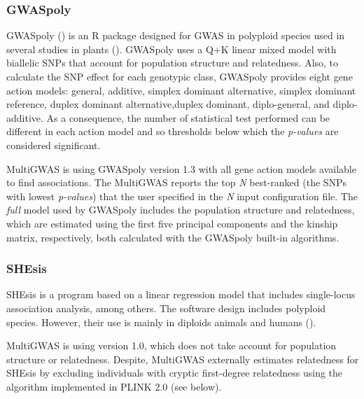 \documentclass{article}
\begin{document}
\subsubsection{GWASpoly}
GWASpoly (\cite{Rosyara2016}) is an R package designed for GWAS in polyploid species used in several studies in plants (\cite{Berdugo2017,Ferrao2018,Sharma2018,Yuan2019}). GWASpoly uses a Q+K linear mixed model with biallelic SNPs that account for population structure and relatedness. Also, to calculate the SNP effect for each genotypic class, GWASpoly provides eight gene action models: general, additive, simplex dominant alternative, simplex dominant reference, duplex dominant alternative,duplex dominant, diplo-general, and diplo-additive. As a consequence, the number of statistical test performed can be different in each action model and so thresholds below which the \emph{p-values} are considered significant.

MultiGWAS is using GWASpoly version 1.3 with all gene action models available to find associations. The MultiGWAS reports the top \emph{N} best-ranked (the SNPs with lowest \emph{p-values})  that the user specified in the \emph{N} input configuration file. The \emph{full }model used by GWASpoly includes the population structure and relatedness, which are estimated using the first five principal components and the kinship matrix, respectively, both calculated with the GWASpoly built-in algorithms.

\subsubsection{SHEsis}

SHEsis is a program based on a linear regression model that includes single-locus association analysis, among others. The software design includes polyploid species. However, their use is mainly in diploids animals and humans (\cite{Qiao2015,Meng2019}).

MultiGWAS is using version 1.0, which does not take account for population structure or relatedness. Despite, MultiGWAS externally estimates relatedness for SHEsis by excluding individuals with cryptic first-degree relatedness using the algorithm implemented in PLINK 2.0 (see below).
\end{document}
